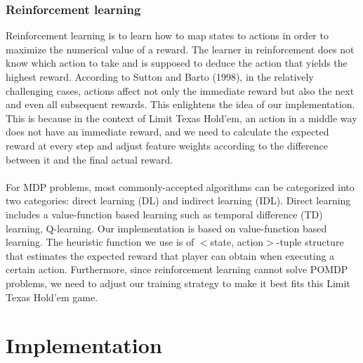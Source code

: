 \documentclass{article}
\begin{document}
\subsubsection{Reinforcement learning}
Reinforcement learning is to learn how to map states to actions in order to maximize the numerical value of a reward. The learner in reinforcement does not know which action to take and is supposed to deduce the action that yields the highest reward. According to Sutton and Barto (1998), in the relatively challenging cases, actions affect not only the immediate reward but also the next and even all subsequent rewards. This enlightens the idea of our implementation. This is because in the context of Limit Texas Hold’em, an action in a middle way does not have an immediate reward, and we need to calculate the expected reward at every step and adjust feature weights according to the difference between it and the final actual reward. 
\\
\\For MDP problems, most commonly-accepted algorithms can be categorized into two categories: direct learning (DL) and indirect learning (IDL). Direct learning includes a value-function based learning such as temporal difference (TD) learning, Q-learning. Our implementation is based on value-function based learning. The heuristic function we use is of $<$state, action$>$-tuple structure that estimates the expected reward that player can obtain when executing a certain action.
Furthermore, since reinforcement learning cannot solve POMDP problems, we need to adjust our training strategy to make it best fits this Limit Texas Hold’em game. 

\section{Implementation}
\end{document}
